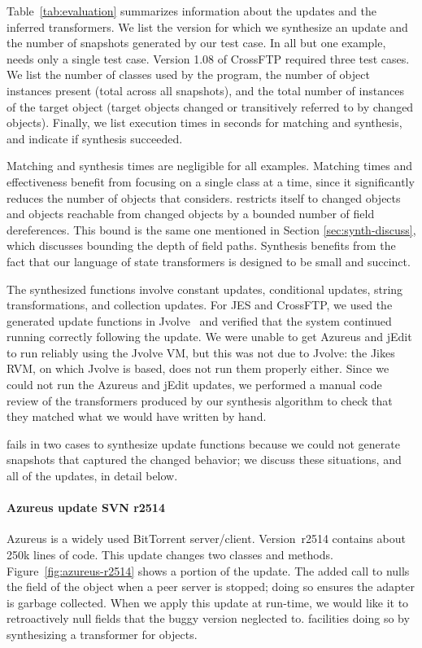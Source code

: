 Table~\ref{tab:evaluation} summarizes information about the updates
and the inferred transformers.  We list the version for which we
synthesize an update and the number of snapshots generated by our test
case. In all but one example, \TOS needs only a single test case.  
Version 1.08 of CrossFTP required three test cases.
We list the number of classes used by the program, the number of object
instances present (total across all snapshots), and the total number of
instances of the target object (target objects changed or transitively
referred to by changed objects). Finally, we list execution times in
seconds for
matching and synthesis, and indicate if synthesis succeeded.

Matching and synthesis times are negligible for all examples.  Matching
times and effectiveness benefit from focusing on a single class at a
time, since it
significantly reduces the number of objects that \TOS considers.
\TOS restricts itself to changed objects and objects reachable from changed
objects by a bounded number of field dereferences.  This bound is the
same one mentioned in Section \ref{sec:synth-discuss}, which discusses
bounding the depth of field paths.
Synthesis benefits from the fact that our language of state
transformers is designed to be small and succinct.

The synthesized functions involve
constant updates, conditional updates, string transformations, and
collection updates.  For JES and CrossFTP, we used the generated
update functions in Jvolve~\cite{jvolve} and verified that the system
continued running correctly following the update.  We were unable to
get Azureus and jEdit to run reliably using the Jvolve VM, but this
was not due to Jvolve: the Jikes RVM, on which Jvolve is based, does
not run them properly either.  Since we could not run the Azureus
and jEdit updates, we performed a manual code
review of the transformers produced by our synthesis algorithm to check that
they matched what we would have written by hand.

\TOS fails in two cases to synthesize update functions because we
could not generate snapshots that captured the changed behavior;
we discuss these situations, and all of the updates, in detail below.

\paragraph*{Azureus update SVN r2514}

Azureus is a widely used BitTorrent server/client. Version~r2514
contains about 250k lines of code. This update changes two classes and
methods.  Figure~\ref{fig:azureus-r2514}
shows a portion of the update.  The added call to
 nulls the  field of the
 object when a peer server is stopped; doing so ensures
the adapter is garbage collected.  When we apply this update at
run-time, we would like it to
retroactively null  fields that the buggy version
neglected to.  \TOS facilities doing so by synthesizing a transformer for 
 objects.

